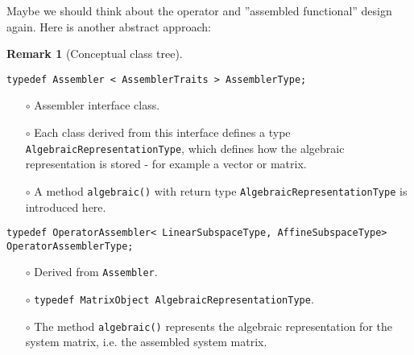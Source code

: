 \documentclass[a4paper,11pt]{article}
\numberwithin{equation}{section}
\newtheorem{remark}[definition]{Remark}
\newcommand{\theoremNewline}{\hspace{1mm}\\}
\newcommand{\theoremEndLine}{\hspace{1mm}}
\newcommand{\CodeT}[1]{\textnormal{\texttt{#1}}}
\begin{document}
Maybe we should think about the operator and ''assembled functional'' design again. Here is another abstract approach:\\

\begin{remark}[Conceptual class tree]\theoremNewline
	\end{remark}\theoremEndLine

\noindent\CodeT{typedef Assembler < AssemblerTraits > AssemblerType;}
\begin{itemize}
	\item[$\circ$] Assembler interface class.
	\item[$\circ$] Each class derived from this interface defines a type \CodeT{AlgebraicRepresentationType}, which defines how the algebraic representation is stored - for example a vector or matrix.
	\item[$\circ$] A method \CodeT{algebraic()} with return type \CodeT{AlgebraicRepresentationType} is introduced here.
\end{itemize}

\noindent\CodeT{typedef OperatorAssembler< LinearSubspaceType, AffineSubspaceType>}\\
\CodeT{OperatorAssemblerType;}
\begin{itemize}
	\item[$\circ$] Derived from \CodeT{Assembler}.
	\item[$\circ$] \CodeT{typedef MatrixObject AlgebraicRepresentationType}.
	\item[$\circ$] The method \CodeT{algebraic()} represents the algebraic representation for the system matrix, i.e. the assembled system matrix.
\end{itemize}
\end{document}
